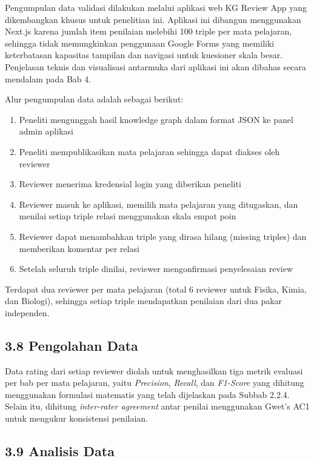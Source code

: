 \documentclass[
]{article}
\begin{document}
Pengumpulan data validasi dilakukan melalui aplikasi web KG Review App
yang dikembangkan khusus untuk penelitian ini. Aplikasi ini dibangun
menggunakan Next.js karena jumlah item penilaian melebihi 100 triple per
mata pelajaran, sehingga tidak memungkinkan penggunaan Google Forms yang
memiliki keterbatasan kapasitas tampilan dan navigasi untuk kuesioner
skala besar. Penjelasan teknis dan visualisasi antarmuka dari aplikasi
ini akan dibahas secara mendalam pada Bab 4.

Alur pengumpulan data adalah sebagai berikut:

\begin{enumerate}
\def\labelenumi{\arabic{enumi}.}
\item
  Peneliti mengunggah hasil knowledge graph dalam format JSON ke panel
  admin aplikasi
\item
  Peneliti mempublikasikan mata pelajaran sehingga dapat diakses oleh
  reviewer
\item
  Reviewer menerima kredensial login yang diberikan peneliti
\item
  Reviewer masuk ke aplikasi, memilih mata pelajaran yang ditugaskan,
  dan menilai setiap triple relasi menggunakan skala empat poin
\item
  Reviewer dapat menambahkan triple yang dirasa hilang (missing triples)
  dan memberikan komentar per relasi
\item
  Setelah seluruh triple dinilai, reviewer mengonfirmasi penyelesaian
  review
\end{enumerate}

Terdapat dua reviewer per mata pelajaran (total 6 reviewer untuk Fisika,
Kimia, dan Biologi), sehingga setiap triple mendapatkan penilaian dari
dua pakar independen.

\hypertarget{pengolahan-data}{%
\subsection{3.8 Pengolahan Data}\label{pengolahan-data}}

Data rating dari setiap reviewer diolah untuk menghasilkan tiga metrik
evaluasi per bab per mata pelajaran, yaitu \emph{Precision},
\emph{Recall}, dan \emph{F1-Score} yang dihitung menggunakan formulasi
matematis yang telah dijelaskan pada Subbab 2.2.4. Selain itu, dihitung
\emph{inter-rater agreement} antar penilai menggunakan Gwet's AC1 untuk
mengukur konsistensi penilaian.

\hypertarget{analisis-data}{%
\subsection{3.9 Analisis Data}\label{analisis-data}}
\end{document}
